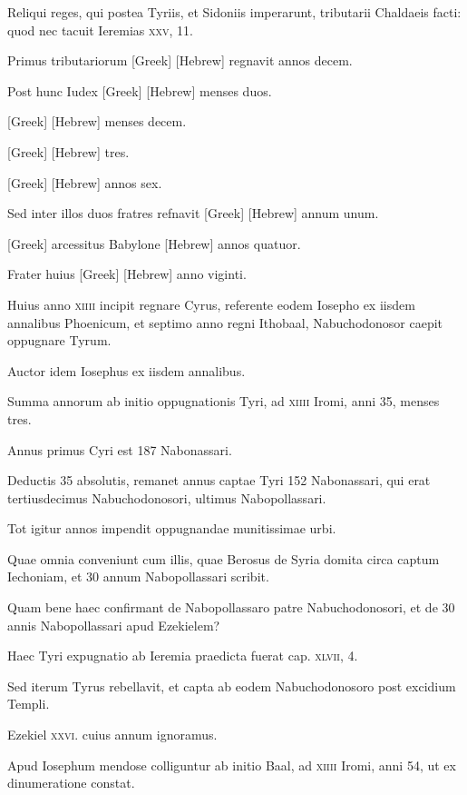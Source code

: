 \begin{parnumbers}
Reliqui reges, qui postea Tyriis, et Sidoniis imperarunt, tributarii
Chaldaeis facti: quod nec tacuit Ieremias \textsc{xxv}, 11.

Primus
tributariorum \textgreek{[Greek]} \texthebrew{[Hebrew]} regnavit annos decem.

Post hunc Iudex
\textgreek{[Greek]} \texthebrew{[Hebrew]} menses duos.

\textgreek{[Greek]} \texthebrew{[Hebrew]} menses decem.

\textgreek{[Greek]} \texthebrew{[Hebrew]} tres.

\textgreek{[Greek]} \texthebrew{[Hebrew]}
annos sex.

Sed inter illos duos fratres refnavit \textgreek{[Greek]} \texthebrew{[Hebrew]}
annum unum.

\textgreek{[Greek]} arcessitus Babylone \texthebrew{[Hebrew]} annos quatuor.

Frater huius \textgreek{[Greek]} \texthebrew{[Hebrew]} anno viginti.

Huius anno \textsc{xiiii}
incipit regnare Cyrus, referente eodem Iosepho ex iisdem annalibus
Phoenicum, et septimo anno regni Ithobaal, Nabuchodonosor
caepit oppugnare Tyrum.

Auctor idem Iosephus ex iisdem
annalibus.

Summa annorum ab initio oppugnationis Tyri, ad
\textsc{xiiii} Iromi, anni 35, menses tres.

Annus primus Cyri est 187 Nabonassari.

Deductis 35 absolutis, remanet annus captae Tyri 152
Nabonassari, qui erat tertiusdecimus Nabuchodonosori, ultimus
Nabopollassari.

Tot igitur annos impendit oppugnandae munitissimae
urbi.

Quae omnia conveniunt cum illis, quae Berosus de Syria
domita circa captum Iechoniam, et 30 annum Nabopollassari scribit.

Quam bene haec confirmant de Nabopollassaro patre Nabuchodonosori,
et de 30 annis Nabopollassari apud Ezekielem?

Haec Tyri expugnatio ab Ieremia praedicta fuerat cap. \textsc{xlvii}, 4.

Sed iterum
Tyrus rebellavit, et capta ab eodem Nabuchodonosoro post
excidium Templi.

Ezekiel \textsc{xxvi}. cuius annum ignoramus.

Apud
Iosephum mendose colliguntur ab initio Baal, ad \textsc{xiiii} Iromi, anni
54, ut ex dinumeratione constat.


\end{parnumbers}
